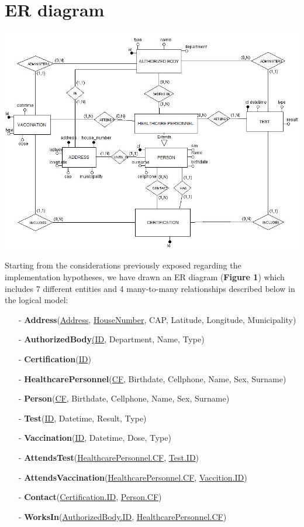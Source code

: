 \documentclass[a4paper,12pt]{article}
\begin{document}
\section{ER diagram}
\paragraph{}
	\begin{center}
 		\includegraphics[width = 15 cm]{ER_diagram.png}
	\end{center}
\par Starting from the considerations previously exposed regarding the implementation hypotheses, we have drawn an ER diagram (\textbf{Figure 1}) which includes 7 different entities and 4 many-to-many relationships described below in the logical model: \par
  \begin{itemize}[noitemsep]
   	\item[-]	\textbf{Address}(\underline{Address}, \underline{HouseNumber}, CAP, Latitude, Longitude, Municipality)
	\item[-]	\textbf{AuthorizedBody}\underline{(ID}, Department, Name, Type)
	\item[-]	\textbf{Certification}(\underline{ID})
	\item[-]	\textbf{HealthcarePersonnel}(\underline{CF}, Birthdate, Cellphone, Name, Sex, Surname)
	\item[-]	\textbf{Person}(\underline{CF}, Birthdate, Cellphone, Name, Sex, Surname)
	\item[-]	\textbf{Test}(\underline{ID}, Datetime, Result, Type)
	\item[-]	\textbf{Vaccination}(\underline{ID}, Datetime, Dose, Type)
\item[-]	\textbf{AttendsTest}(\underline{HealthcarePersonnel.CF}, \underline{Test.ID})	
	\item[-]	\textbf{AttendsVaccination}(\underline{HealthcarePersonnel.CF}, \underline{Vaccition.ID})
	\item[-]	\textbf{Contact}(\underline{Certification.ID}, \underline{Person.CF})
	\item[-]	\textbf{WorksIn}(\underline{AuthorizedBody.ID}, \underline{HealthcarePersonnel.CF})
  \end{itemize} \par
\end{document}
